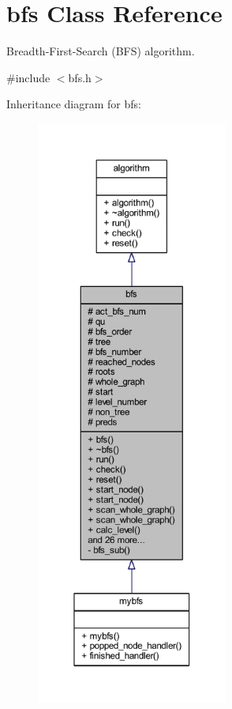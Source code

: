 \hypertarget{classbfs}{}\section{bfs Class Reference}
\label{classbfs}


Breadth-\/\+First-\/\+Search (B\+FS) algorithm.  




{\ttfamily \#include $<$bfs.\+h$>$}



Inheritance diagram for bfs\+:\nopagebreak
\begin{figure}[H]
\begin{center}
\leavevmode
\includegraphics[height=550pt]{classbfs__inherit__graph}
\end{center}
\end{figure}



